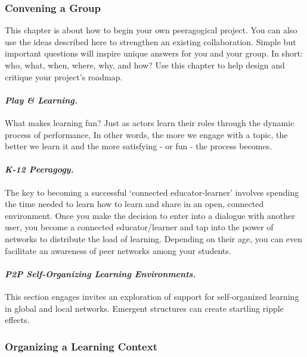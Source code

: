 \subsubsection{Convening a Group}\label{convening-a-group}

This chapter is about how to begin your own peeragogical project. You
can also use the ideas described here to strengthen an existing
collaboration. Simple but important questions will inspire unique
answers for you and your group. In short: who, what, when, where, why,
and how? Use this chapter to help design and critique your project's
roadmap.

\paragraph{\emph{Play \& Learning.}}\label{play-learning.}

What makes learning fun? Just as actors learn their roles through the
dynamic process of performance, In other words, the more we engage with
a topic, the better we learn it and the more satisfying - or fun - the
process becomes.

\paragraph{\emph{K-12 Peeragogy.}}\label{k-12-peeragogy.}

The key to becoming a successful `connected educator-learner' involves
spending the time needed to learn how to learn and share in an open,
connected environment. Once you make the decision to enter into a
dialogue with another user, you become a connected educator/learner and
tap into the power of networks to distribute the load of learning.
Depending on their age, you can even facilitate an awareness of peer
networks among your students.

\paragraph{\emph{P2P Self-Organizing Learning
Environments.}}\label{p2p-self-organizing-learning-environments.}

This section engages invites an exploration of support for
self-organized learning in global and local networks. Emergent
structures can create startling ripple effects.

\subsubsection{Organizing a Learning
Context}\label{organizing-a-learning-context}

